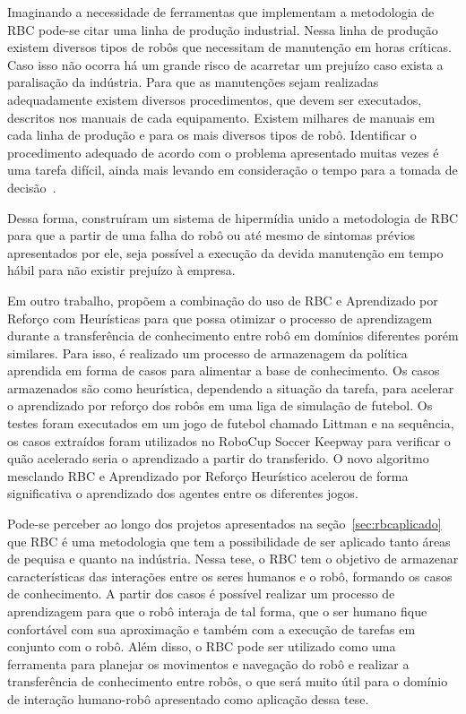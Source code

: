 Imaginando a necessidade de ferramentas que implementam a metodologia de RBC pode-se citar uma linha de produção industrial. Nessa linha de produção existem diversos tipos de robôs que necessitam de manutenção em horas críticas. Caso isso não ocorra há um grande risco de acarretar um prejuízo caso exista a paralisação da indústria. Para que as manutenções sejam realizadas adequadamente existem diversos procedimentos, que devem ser executados, descritos nos manuais de cada equipamento. Existem milhares de manuais em cada linha de produção e para os mais diversos tipos de robô. Identificar o procedimento adequado de acordo com o problema apresentado muitas vezes é uma tarefa difícil, ainda mais levando em consideração o tempo para a tomada de decisão~\cite{Crowder:2000}.

Dessa forma,  construíram um sistema de hipermídia unido a metodologia de RBC para que a partir de uma falha do robô ou até mesmo de sintomas prévios apresentados por ele, seja possível a execução da devida manutenção em tempo hábil para não existir prejuízo à empresa.

Em outro trabalho, \cite{CelibertoJr:2012} propõem a combinação do uso de RBC e Aprendizado por Reforço com Heurísticas para que possa otimizar o processo de aprendizagem durante a transferência de conhecimento entre robô em domínios diferentes porém similares. Para isso, é realizado um processo de armazenagem da política aprendida em forma de casos para alimentar a base de conhecimento. Os casos armazenados são como heurística, dependendo a situação da tarefa, para acelerar o aprendizado por reforço dos robôs em uma liga de simulação de futebol. Os testes foram executados em um jogo de futebol chamado Littman e na sequência, os casos extraídos foram utilizados no RoboCup Soccer Keepway para verificar o quão acelerado seria o aprendizado a partir do transferido. O novo algoritmo mesclando RBC e Aprendizado por Reforço Heurístico acelerou de forma significativa o aprendizado dos agentes entre os diferentes jogos.

Pode-se perceber ao longo dos projetos apresentados na seção~\ref{sec:rbcaplicado} que RBC é uma metodologia que tem a possibilidade de ser aplicado tanto áreas de pequisa e quanto na indústria. Nessa tese, o RBC tem o objetivo de armazenar características das interações entre os seres humanos e o robô, formando os casos de conhecimento. A partir dos casos é possível realizar um processo de aprendizagem para que o robô interaja de tal forma, que o ser humano fique confortável com sua aproximação e também com a execução de tarefas em conjunto com o robô. Além disso, o RBC pode ser utilizado como uma ferramenta para planejar os movimentos e navegação do robô e realizar a transferência de conhecimento entre robôs, o que será muito útil para o domínio de interação humano-robô apresentado como aplicação dessa tese.
